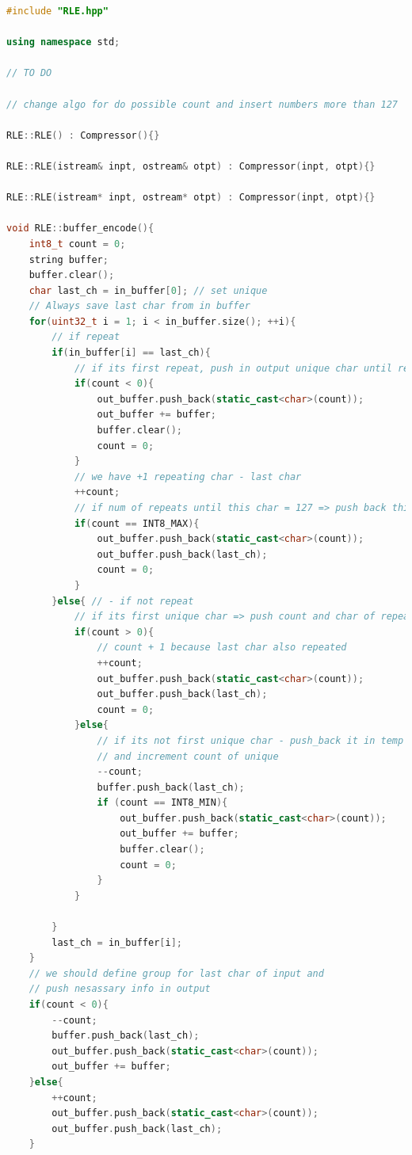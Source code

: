 \begin{lstlisting}[language=C++]
#include "RLE.hpp"

using namespace std;

// TO DO

// change algo for do possible count and insert numbers more than 127

RLE::RLE() : Compressor(){}

RLE::RLE(istream& inpt, ostream& otpt) : Compressor(inpt, otpt){}

RLE::RLE(istream* inpt, ostream* otpt) : Compressor(inpt, otpt){}

void RLE::buffer_encode(){
    int8_t count = 0;
    string buffer;
    buffer.clear();
    char last_ch = in_buffer[0]; // set unique
    // Always save last char from in buffer
    for(uint32_t i = 1; i < in_buffer.size(); ++i){
        // if repeat
        if(in_buffer[i] == last_ch){
            // if its first repeat, push in output unique char until repeat chars
            if(count < 0){
                out_buffer.push_back(static_cast<char>(count));
                out_buffer += buffer;
                buffer.clear();
                count = 0;
            }
            // we have +1 repeating char - last char
            ++count;
            // if num of repeats until this char = 127 => push back this info and go next
            if(count == INT8_MAX){
                out_buffer.push_back(static_cast<char>(count));
                out_buffer.push_back(last_ch);
                count = 0;
            }
        }else{ // - if not repeat
            // if its first unique char => push count and char of repeats
            if(count > 0){
                // count + 1 because last char also repeated
                ++count;
                out_buffer.push_back(static_cast<char>(count));
                out_buffer.push_back(last_ch);
                count = 0;
            }else{
                // if its not first unique char - push_back it in temp buffer
                // and increment count of unique
                --count;
                buffer.push_back(last_ch);
                if (count == INT8_MIN){
                    out_buffer.push_back(static_cast<char>(count));
                    out_buffer += buffer;
                    buffer.clear();
                    count = 0;
                }
            }
            
        }
        last_ch = in_buffer[i];
    }
    // we should define group for last char of input and 
    // push nesassary info in output
    if(count < 0){
        --count;
        buffer.push_back(last_ch);
        out_buffer.push_back(static_cast<char>(count));
        out_buffer += buffer;
    }else{
        ++count;
        out_buffer.push_back(static_cast<char>(count));
        out_buffer.push_back(last_ch);
    }
    

\end{lstlisting}
